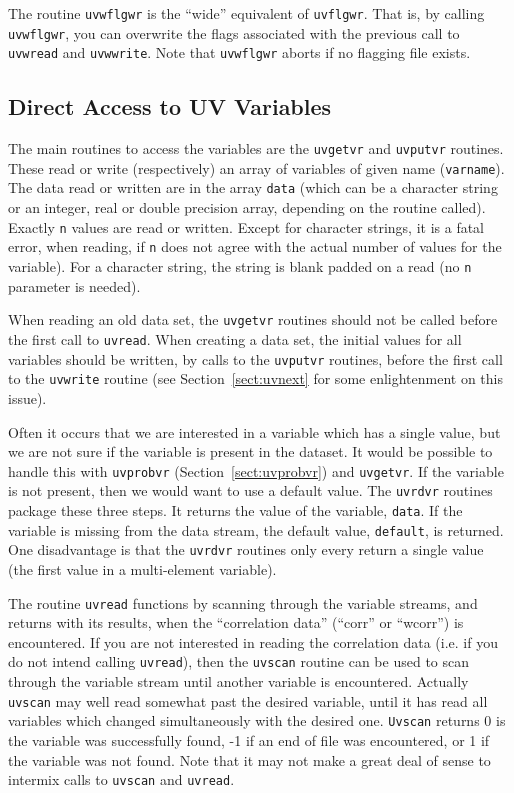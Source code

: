 \documentclass{report}
\begin{document}
The routine {\tt uvwflgwr} is the ``wide'' equivalent of {\tt uvflgwr}.
That is, by calling {\tt uvwflgwr}, you can overwrite the flags associated
with the previous call to
{\tt uvwread} and {\tt uvwwrite}. Note that {\tt uvwflgwr} aborts if no
flagging file exists.

\subsection{Direct Access to UV Variables}
The main routines to access the variables are the {\tt uvgetvr} and
{\tt uvputvr} routines. These read or write (respectively) an array of
variables of given name ({\tt varname}). The data read or written are
in the array {\tt data} (which can be a character string or an integer, real
or double precision
array, depending on the routine called). Exactly {\tt n} values are
read or written. Except for character strings, it is a fatal error,
when reading, if {\tt n} does not
agree with the actual number of values for the variable). For a character
string, the string is blank padded on a read (no {\tt n} parameter is
needed).

When reading an old data set, the {\tt uvgetvr} routines should not be called
before the first call to {\tt uvread}.
When creating a data set, the initial values for all variables should be
written, by calls to the {\tt uvputvr} routines, before the first call
to the {\tt uvwrite} routine (see Section~\ref{sect:uvnext} for
some enlightenment on this issue).

Often it occurs that we are interested in a variable which has a single
value, but we are not sure if the variable is present in the dataset.
It would be possible to handle this with {\tt uvprobvr}
(Section~\ref{sect:uvprobvr}) and {\tt uvgetvr}.
If the variable is not present, then we would want to use a default value.
The {\tt uvrdvr} routines package these three steps. It returns the
value of the variable, {\tt data}. If the variable is missing from the
data stream, the default value, {\tt default}, is returned. One disadvantage
is that the {\tt uvrdvr} routines only every return a single value (the first
value in a multi-element variable).

The routine {\tt uvread} functions by scanning through the variable streams,
and returns with its results, when the ``correlation data'' (``corr'' or
``wcorr'')
is encountered. If you are not interested in reading the correlation data
(i.e. if you do not intend calling {\tt uvread}),
then the {\tt uvscan} routine can be used to scan through the variable stream
until another variable is encountered. Actually {\tt uvscan} may well read
somewhat past the desired variable, until it has read
all variables which changed simultaneously with the desired one.
{\tt Uvscan} returns 0 is the variable was
successfully found, -1 if an end of file was encountered, or 1 if the
variable was not found. Note that it may not make a great
deal of sense to intermix calls to {\tt uvscan} and {\tt uvread}.
\end{document}
